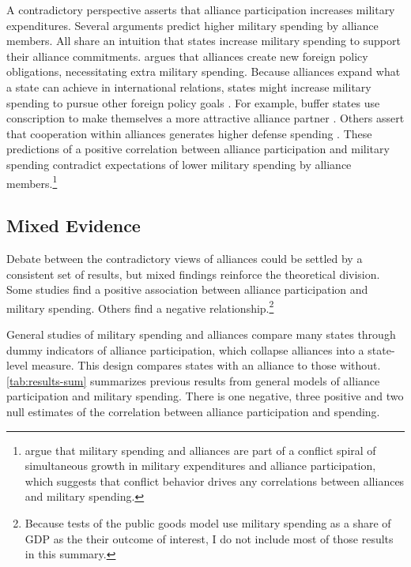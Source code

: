 \documentclass[12pt]{article}
\begin{document}
A contradictory perspective asserts that alliance participation increases military expenditures. 
Several arguments predict higher military spending by alliance members.
All share an intuition that states increase military spending to support their alliance commitments. 
\citet{Diehl1994} argues that alliances create new foreign policy obligations, necessitating extra military spending.
Because alliances expand what a state can achieve in international relations, states might increase military spending to pursue other foreign policy goals \citep{MorganPalmer2006}.
For example, buffer states use conscription to make themselves a more attractive alliance partner \citep{Horowitzetal2017}.
Others assert that cooperation within alliances generates higher defense spending \citep{Palmer1990, QuirozFlores2011}. 
These predictions of a positive correlation between alliance participation and military spending contradict expectations of lower military spending by alliance members.\footnote{
\citet{SeneseVasquez2008} argue that military spending and alliances are part of a conflict spiral of simultaneous growth in military expenditures and alliance participation, which suggests that conflict behavior drives any correlations between alliances and military spending. 
}


\subsection{Mixed Evidence} 


Debate between the contradictory views of alliances could be settled by a consistent set of results, but mixed findings reinforce the theoretical division.
Some studies find a positive association between alliance participation and military spending. 
Others find a negative relationship.\footnote{
Because tests of the public goods model use military spending as a share of GDP as the their outcome of interest, I do not include most of those results in this summary.} 


General studies of military spending and alliances compare many states through dummy indicators of alliance participation, which collapse alliances into a state-level measure. 
This design compares states with an alliance to those without.
\autoref{tab:results-sum} summarizes previous results from general models of alliance participation and military spending. 
There is one negative, three positive and two null estimates of the correlation between alliance participation and spending. 
\end{document}
